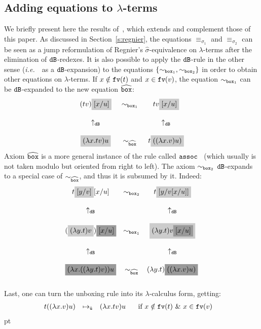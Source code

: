 \documentclass{LMCS}
\newcommand{\ie}{{\it  i.e.}~}
\newcommand{\sep}{\hspace*{0.5cm}}
\renewcommand{\>}{\rightarrow}
\def\lam{\lambda}
\def\sig{\sigma}
\newcommand{\rRew}[1]{\mapsto_{#1}}
\newcommand{\B}{{\tt dB}}
\newcommand{\fv}[1]{{\tt fv}(#1)}
\newcommand{\set}[1]{ \{ #1 \}}
\newcommand{\unboxed}{{\tt u}}
\newcommand{\eqw}[1]{\equiv_{#1}}
\newcommand{\preeqw}[1]{\sim_{#1}}
\def\rsig{\hat{\sigma}}
\newcommand{\runboxed}{\hat{\unboxed}}
\newcommand{\grisar}[1]{\colorbox{LightGray}{\ensuremath{#1}}}
\newcommand{\grisarOscuro}[1]{\colorbox{DarkGray}{\ensuremath{#1}}}
\newcommand{\boite}{{\tt box}}
\newcommand{\sigt}{\boite_1}
\newcommand{\sigq}{\boite_2}
\newcommand{\rsigt}{\widehat{\boite}}
\begin{document}
\subsection{Adding equations to $\lam$-terms}
\label{ssec:rene}
We briefly present here the results of~\cite{AKLPAR}, which
extends and complement those of this paper. As discussed in
Section~\ref{s:regnier}, the equations $\eqw{\sig_1}$ and
$\eqw{\sig_2}$ can be seen as a jump reformulation of Regnier's
$\rsig$-equivalence on $\lam$-terms after the elimination of $\B$-redexes. It is
also possible to apply the $\B$-rule in the other sense (\ie\ as a $\B$-expansion)
to the equations $\set{\preeqw{\sigt},\preeqw{\sigq}}$ in order to obtain other
equations  on $\lam$-terms. If $x\notin \fv{t}$
and $x\in \fv{v}$, the equation $\preeqw{\sigt}$ can be $\B$-expanded to the new equation $\rsigt$:
\[ \begin{array}{c@{\sep}c@{\sep}c}
(t v)\grisar{[x/u]}   & \preeqw{\sigt} & t v\grisar{[x/u]} \\\\
\uparrow_\B             & &  	\uparrow_\B \\\\
 \grisar{(\lam x.t v) u} & \preeqw{\rsigt}  & t \grisar{((\lam x. v) u)}
\end{array}\] 
Axiom $\rsigt$ is a more general
instance of the rule called 
${\tt assoc}$~\cite{Moggi89,DBLP:journals/corr/abs-0806-4859,DBLP:journals/tcs/David11}
(which usually is not taken modulo but oriented from right to left). The axiom
$\preeqw{\sigq}$ $\B$-expands to a special case of
$\preeqw{\rsigt}$, and thus it is subsumed 
by it. Indeed:
\[ \begin{array}{cccccc}
t\grisar{[y/v]}[x/u]    & \preeqw{\sigq} & t\grisar{[y/v[x/u]]} \\\\

\uparrow_\B & &  	\uparrow_\B \\\\
(\grisar{(\lam y. t) v})\grisarOscuro{[x/u]}    & \preeqw{\sigt} & 
\grisar{(\lam y. t) v\grisarOscuro{[x/u]}} \\\\
\uparrow_\B & &  	\uparrow_\B \\\\
\grisarOscuro{(\lam x. ((\lam y. t) v))u}    & \preeqw{\rsigt} & 
(\lam y. t) \grisarOscuro{((\lam x. v)u)} \\\\
\end{array}\] 
Last, one can turn the unboxing rule into its $\lam$-calculus form, getting:
\[ \begin{array}{lll@{\hspace{.5cm}}l}
t ((\lam x. v) u)     & \rRew{\runboxed} & (\lam x.t v) u \sep \mbox{ if } x \notin \fv{t}\ \&\ x\in \fv{v} \\
\end{array}\] pt
\end{document}
